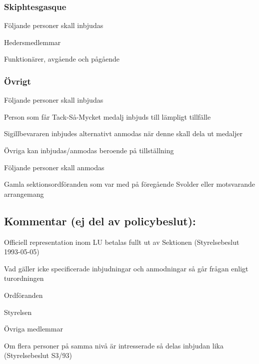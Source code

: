 \documentclass[10pt]{article}
\begin{document}
\subsubsection*{Skiphtesgasque}
Följande personer skall inbjudas
\begin{dashlist}
\item Hedersmedlemmar
\item Funktionärer, avgående och pågående
\end{dashlist}

\subsubsection*{Övrigt}
Följande personer skall inbjudas
\begin{dashlist}
\item Person som får Tack-Så-Mycket medalj inbjuds till lämpligt tillfälle
\item Sigillbevararen inbjudes alternativt anmodas när denne skall dela ut
medaljer
\item Övriga kan inbjudas/anmodas beroende på tillställning
\end{dashlist}
Följande personer skall anmodas
\begin{dashlist}
\item Gamla sektionsordföranden som var med på föregående Svolder eller
motsvarande arrangemang
\end{dashlist}


\newpage
\subsection*{Kommentar (ej del av policybeslut):}
\begin{dashlist}
\item Officiell representation inom LU betalas fullt ut av Sektionen
(Styrelsebeslut 1993-05-05)
\item Vad gäller icke specificerade inbjudningar och anmodningar så går
frågan enligt turordningen
\begin{numplist}
\item Ordföranden
\item Styrelsen
\item Övriga medlemmar
\end{numplist}
\item Om flera personer på samma nivå är intresserade så delas inbjudan lika
(Styrelsebeslut S3/93)
\end{dashlist}
\end{document}
